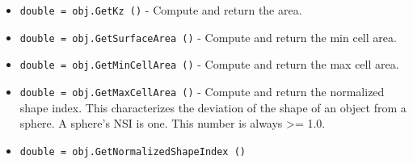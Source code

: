 \begin{itemize}
\item  \verb|double = obj.GetKz ()| -  Compute and return the area.

\item  \verb|double = obj.GetSurfaceArea ()| -  Compute and return the min cell area.

\item  \verb|double = obj.GetMinCellArea ()| -  Compute and return the max cell area.

\item  \verb|double = obj.GetMaxCellArea ()| -  Compute and return the normalized shape index. This characterizes the
 deviation of the shape of an object from a sphere. A sphere's NSI
 is one. This number is always >= 1.0.

\item  \verb|double = obj.GetNormalizedShapeIndex ()|

\end{itemize}
